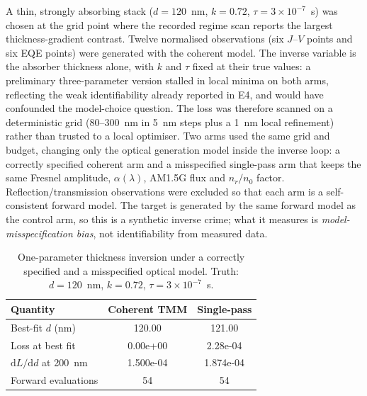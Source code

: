\documentclass[preprint,12pt]{elsarticle}
\newcommand{\dd}{\mathrm{d}}
\begin{document}
A thin, strongly absorbing stack ($d=120$~nm, $k=0.72$, $\tau=3\times10^{-7}$~s)
was chosen at the grid point where the recorded regime scan reports the
largest thickness-gradient contrast. Twelve normalised observations (six
$J$--$V$ points and six EQE points) were generated with the coherent model.
The inverse variable is the absorber thickness alone, with $k$ and $\tau$
fixed at their true values: a preliminary three-parameter version stalled in
local minima on both arms, reflecting the weak identifiability already
reported in E4, and would have confounded the model-choice question. The
loss was therefore scanned on a deterministic grid (80--300~nm in 5~nm steps
plus a 1~nm local refinement) rather than trusted to a local optimiser. Two
arms used the same grid and budget, changing only the optical generation
model inside the inverse loop: a correctly specified coherent arm and a
misspecified single-pass arm that keeps the same Fresnel amplitude,
$\alpha(\lambda)$, AM1.5G flux and $n_r/n_0$ factor. Reflection/transmission
observations were excluded so that each arm is a self-consistent forward
model. The target is generated by the same forward model as the control arm,
so this is a synthetic inverse crime; what it measures is
\emph{model-misspecification bias}, not identifiability from measured data.

\begin{table}[t]
\caption{One-parameter thickness inversion under a correctly specified and a
misspecified optical model. Truth: $d=120$~nm, $k=0.72$,
$\tau=3\times10^{-7}$~s.}
\label{tab:optical_inverse}
\centering
\footnotesize
\begin{tabular}{lcc}
\toprule
Quantity & Coherent TMM & Single-pass \\
\midrule
Best-fit $d$ (nm) & 120.00 & 121.00 \\
Loss at best fit & 0.00e+00 & 2.28e-04 \\
$\dd L/\dd d$ at 200~nm & 1.500e-04 & 1.874e-04 \\
Forward evaluations & 54 & 54 \\
\bottomrule
\end{tabular}
\end{table}
\end{document}

